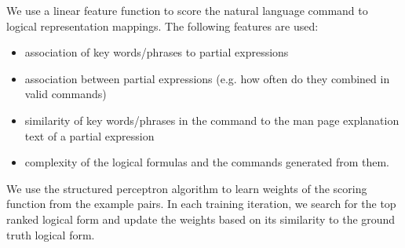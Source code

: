 We use a linear feature function to score the natural language command to logical representation mappings. The following features are used:
\begin{itemize}\itemsep-1pt
	\item association of key words/phrases to partial expressions
	\item association between partial expressions (e.g. how often do they combined in valid commands)
	\item similarity of key words/phrases in the command to the man page explanation text of a partial expression
	\item complexity of the logical formulas and the commands generated from them.
\end{itemize}
We use the structured perceptron algorithm to learn weights of the scoring function from the example pairs. In each training iteration, we search for the top ranked logical form and update the weights based on its similarity to the ground truth logical form.
